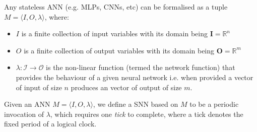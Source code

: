 \begin{definition}
	\label{def:bb-mlp}
	Any stateless \ac{ANN} (e.g. \acp{MLP}, \acp{CNN}, etc) can be formalised as a tuple $M = \langle I, O, \lambda  \rangle$, where:
        \begin{itemize}
        \item $I$ is a finite collection of input variables with
          its domain being $\mathbf{I} =\mathbb{R}^n$
        \item  $O$ is a finite collection of  output variables with
          its domain being $\mathbf{O} = \mathbb{R}^m$
         \item $\lambda: \mathcal{I} \rightarrow \mathcal{O}$ is the non-linear
          function (termed the network function) that provides the behaviour of a given neural network i.e.
          when provided a vector of input of size $n$ produces an
          vector of output of size $m$. 
        \end{itemize}
\end{definition} 

\begin{definition}%

Given an \ac{ANN} $M = \langle I, O, \lambda  \rangle$, we
define a \ac{SNN} based on $M$ to be a periodic invocation of $\lambda$,
which requires one \emph{tick} to complete, where a tick
denotes the fixed period of a logical clock.
\end{definition}


